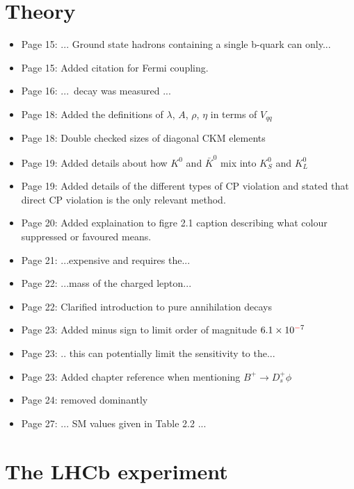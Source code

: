 \documentclass[12pt]{article}
\begin{document}
\section{Theory}
\begin{itemize}
\item Page 15: ... Ground state hadrons {\color{red}containing a single b-quark} can only...
\item Page 15: Added citation for Fermi coupling.
\item Page 16: ... decay {\color{red}was} measured ... 
\item Page 18: Added the definitions of $\lambda$, $A$, $\rho$, $\eta$ in terms of $V_{qq}$
\item Page 18: Double checked sizes of diagonal CKM elements
\item Page 19: Added details about how $K^{0}$ and $\bar{K}^{0}$ mix into $K_{S}^{0}$ and $K_{L}^{0}$
\item Page 19: Added details of the different types of CP violation and stated that direct CP violation is the only relevant method.
\item Page 20: Added explaination to figre 2.1 caption describing what colour suppressed or favoured means.
\item Page 21: ...expensive {\color{red}and} requires the...
\item Page 22: ...mass {\color{red}of the} charged lepton...

\item Page 22: Clarified introduction to pure annihilation decays
\item Page 23: Added minus sign to limit order of magnitude $6.1\times10^{{\color{red}-}7}$
\item Page 23: .. this can {\color{red}potentially} limit the sensitivity {\color{red}to} the...
\item Page 23: Added chapter reference when mentioning $B^+ \rightarrow D^+_s \phi$
\item Page 24: removed {\color{red}dominantly}
\item Page 27: ... SM values given {\color{red}in Table 2.2} ...
\end{itemize}
\section{The LHCb experiment}
\end{document}
